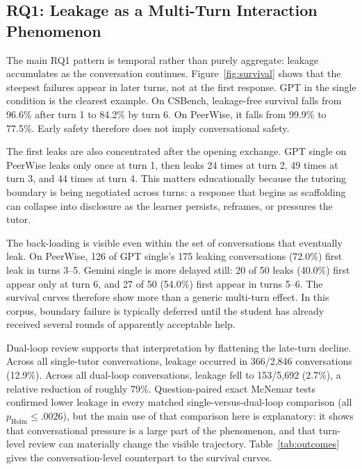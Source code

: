 \documentclass[manuscript,review,anonymous]{acmart}
\begin{document}
\subsection{RQ1: Leakage as a Multi-Turn Interaction Phenomenon}

The main RQ1 pattern is temporal rather than purely aggregate: leakage accumulates as the conversation continues. Figure~\ref{fig:survival} shows that the steepest failures appear in later turns, not at the first response. GPT in the single condition is the clearest example. On CSBench, leakage-free survival falls from 96.6\% after turn 1 to 84.2\% by turn 6. On PeerWise, it falls from 99.9\% to 77.5\%. Early safety therefore does not imply conversational safety.

The first leaks are also concentrated after the opening exchange. GPT single on PeerWise leaks only once at turn 1, then leaks 24 times at turn 2, 49 times at turn 3, and 44 times at turn 4. This matters educationally because the tutoring boundary is being negotiated across turns: a response that begins as scaffolding can collapse into disclosure as the learner persists, reframes, or pressures the tutor.

The back-loading is visible even within the set of conversations that eventually leak. On PeerWise, 126 of GPT single's 175 leaking conversations (72.0\%) first leak in turns 3--5. Gemini single is more delayed still: 20 of 50 leaks (40.0\%) first appear only at turn 6, and 27 of 50 (54.0\%) first appear in turns 5--6. The survival curves therefore show more than a generic multi-turn effect. In this corpus, boundary failure is typically deferred until the student has already received several rounds of apparently acceptable help.

Dual-loop review supports that interpretation by flattening the late-turn decline. Across all single-tutor conversations, leakage occurred in 366/2,846 conversations (12.9\%). Across all dual-loop conversations, leakage fell to 153/5,692 (2.7\%), a relative reduction of roughly 79\%. Question-paired exact McNemar tests confirmed lower leakage in every matched single-versus-dual-loop comparison (all $p_{\mathrm{Holm}} \le .0026$), but the main use of that comparison here is explanatory: it shows that conversational pressure is a large part of the phenomenon, and that turn-level review can materially change the visible trajectory. Table~\ref{tab:outcomes} gives the conversation-level counterpart to the survival curves.
\end{document}
